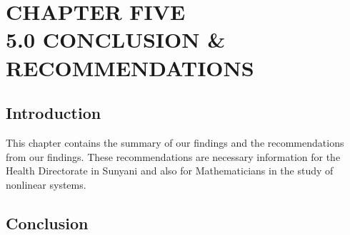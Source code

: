 \chapter{CHAPTER FIVE\\5.0 CONCLUSION \& RECOMMENDATIONS}
\label{Chapter5}
\section{Introduction}
This chapter contains the summary of our findings and the recommendations from our findings. These recommendations are necessary information for the Health Directorate in Sunyani and also for Mathematicians in the study of nonlinear systems.

\section{Conclusion}
